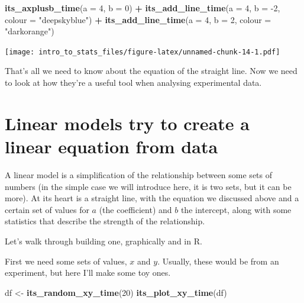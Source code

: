 \documentclass[
]{book}
\newenvironment{Shaded}{\begin{snugshade}}{\end{snugshade}}
\newcommand{\DataTypeTok}[1]{\textcolor[rgb]{0.13,0.29,0.53}{#1}}
\newcommand{\DecValTok}[1]{\textcolor[rgb]{0.00,0.00,0.81}{#1}}
\newcommand{\KeywordTok}[1]{\textcolor[rgb]{0.13,0.29,0.53}{\textbf{#1}}}
\newcommand{\NormalTok}[1]{#1}
\newcommand{\OperatorTok}[1]{\textcolor[rgb]{0.81,0.36,0.00}{\textbf{#1}}}
\newcommand{\StringTok}[1]{\textcolor[rgb]{0.31,0.60,0.02}{#1}}
\begin{document}
\begin{Shaded}
\begin{Highlighting}[]
\KeywordTok{its_axplusb_time}\NormalTok{(}\DataTypeTok{a =} \DecValTok{4}\NormalTok{, }\DataTypeTok{b =} \DecValTok{0}\NormalTok{) }\OperatorTok{+}\StringTok{ }
\StringTok{  }\KeywordTok{its_add_line_time}\NormalTok{(}\DataTypeTok{a =} \DecValTok{4}\NormalTok{, }\DataTypeTok{b =} \DecValTok{-2}\NormalTok{, }\DataTypeTok{colour =} \StringTok{"deepskyblue"}\NormalTok{) }\OperatorTok{+}
\StringTok{  }\KeywordTok{its_add_line_time}\NormalTok{(}\DataTypeTok{a =} \DecValTok{4}\NormalTok{, }\DataTypeTok{b =} \DecValTok{2}\NormalTok{, }\DataTypeTok{colour =} \StringTok{"darkorange"}\NormalTok{)}
\end{Highlighting}
\end{Shaded}

\texttt{[image: intro\_to\_stats\_files/figure-latex/unnamed-chunk-14-1.pdf]}

That's all we need to know about the equation of the straight line. Now we need to look at how they're a useful tool when analysing experimental data.

\hypertarget{linear-models-try-to-create-a-linear-equation-from-data}{%
\section{Linear models try to create a linear equation from data}\label{linear-models-try-to-create-a-linear-equation-from-data}}

A linear model is a simplification of the relationship between some sets of numbers (in the simple case we will introduce here, it is two sets, but it can be more). At its heart is a straight line, with the equation we discussed above and a certain set of values for \(a\) (the coefficient) and \(b\) the intercept, along with some statistics that describe the strength of the relationship.

Let's walk through building one, graphically and in R.

First we need some sets of values, \(x\) and \(y\). Usually, these would be from an experiment, but here I'll make some toy ones.

\begin{Shaded}
\begin{Highlighting}[]
\NormalTok{df <-}\StringTok{ }\KeywordTok{its_random_xy_time}\NormalTok{(}\DecValTok{20}\NormalTok{)}
\KeywordTok{its_plot_xy_time}\NormalTok{(df)}
\end{Highlighting}
\end{Shaded}
\end{document}
